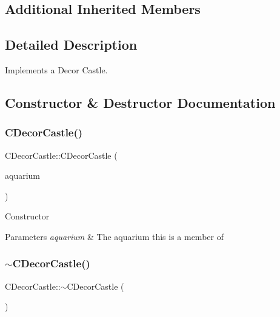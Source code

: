 \subsection*{Additional Inherited Members}


\subsection{Detailed Description}
Implements a Decor Castle. 

\subsection{Constructor \& Destructor Documentation}
\mbox{\label{class_c_decor_castle_a9c88c926ea898a19ef6b726a722f39af}} 
\subsubsection{\texorpdfstring{C\+Decor\+Castle()}{CDecorCastle()}}
{\footnotesize\ttfamily C\+Decor\+Castle\+::\+C\+Decor\+Castle (\begin{DoxyParamCaption}\item[{\mbox{\hyperlink{class_c_aquarium}{C\+Aquarium}} $\ast$}]{aquarium }\end{DoxyParamCaption})}

Constructor 
\begin{DoxyParams}{Parameters}
{\em aquarium} & The aquarium this is a member of \\
\hline
\end{DoxyParams}
\mbox{\label{class_c_decor_castle_a520ef2928c6d8a115200d64060b93c6f}} 
\subsubsection{\texorpdfstring{$\sim$\+C\+Decor\+Castle()}{~CDecorCastle()}}
{\footnotesize\ttfamily C\+Decor\+Castle\+::$\sim$\+C\+Decor\+Castle (\begin{DoxyParamCaption}{ }\end{DoxyParamCaption})\hspace{0.3cm}{\ttfamily [virtual]}}



